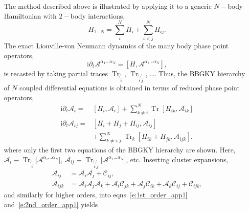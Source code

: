 \documentclass[extendedabs]{bmvc2k}
\newcommand\ii{{\mathrm{i}}}
\DeclareMathOperator{\Tr}{{Tr}}
\newcommand{\Com}[2]{\left[{#1},{#2}\right]}
\begin{document}
The method described above is illustrated by applying it to a generic $N-$body Hamiltonian with $2-$body interactions,
\begin{equation}\label{eq:hgen}
H_{1\dotsc N} = \sum^N_i H_i + \sum^N_{i<j}H_{ij}.
\end{equation}
The exact  Liouville-von Neumann dynamics of the many body phase point operators,
\begin{equation}\label{eq:vneqdwa}
\ii\partial_t \mathscr{A}^{\alpha_1\dots\alpha_N} = \Com{H}{\mathscr{A}^{\alpha_1\dots\alpha_N}},
\end{equation}
is recasted by taking partial traces $\Tr_{\not{\,i}}$, $\Tr_{\not{\,i}\not{\,j}}$, \dots. Thus, the BBGKY hierarchy of $N$ coupled differential equations is obtained in terms of reduced phase point operators, 
\begin{subequations}
\begin{align}
\ii\partial_t \mathscr{A}_i=&\Com{H_i}{\mathscr{A}_i}+\sum^N_{k\neq i}\Tr\Com{H_{ik}}{\mathscr{A}_{ik}}\label{e:1st_order_app1}\\
\ii\partial_t \mathscr{A}_{ij}=&\Com{H_i+H_j+H_{ij}}{\mathscr{A}_{ij}}\nonumber\\
&+\sum^N_{k\neq i,j}\Tr_k\Com{H_{ik}+H_{jk}}{\mathscr{A}_{ijk}},
\label{e:2nd_order_app1}
\end{align}
\end{subequations}
where only the first two equations of the BBGKY hierarchy are shown. Here, $\mathscr{A}_i\equiv \Tr_{\not{\,i}}{\big[\mathscr{A}^{\alpha_1\dots\alpha_N}\big]}$, $\mathscr{A}_{ij}\equiv \Tr_{\not{\,i}\not{\,j}}{\big[\mathscr{A}^{\alpha_1\dots\alpha_N}\big]}$, etc. Inserting cluster expansions,
\begin{subequations}
\begin{align}
\mathscr{A}_{ij}&=\mathscr{A}_i \mathscr{A}_j+\mathscr{C}_{ij},\label{e:cluster1}\\
\mathscr{A}_{ijk}&=\mathscr{A}_i \mathscr{A}_j \mathscr{A}_k + \mathscr{A}_i \mathscr{C}_{jk} + \mathscr{A}_j \mathscr{C}_{ik} + \mathscr{A}_k \mathscr{C}_{ij} + \mathscr{C}_{ijk},\label{e:cluster2}
\end{align}
\end{subequations}
and similarly for higher orders, into eqns~\ref{e:1st_order_app1} and~\ref*{e:2nd_order_app1} yields
\end{document}
